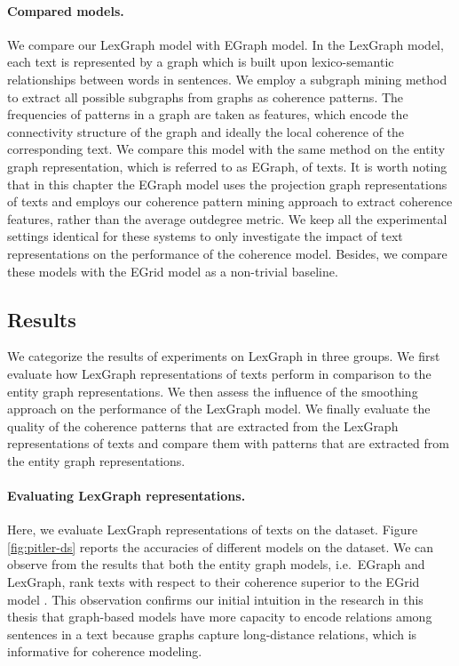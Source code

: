 \paragraph{Compared models.}
We compare our LexGraph model with EGraph model.
In the \mbox{LexGraph} model, each text is represented by a graph which is built upon lexico-semantic relationships between words in sentences.  
We employ a subgraph mining method to extract all possible subgraphs from graphs as coherence patterns. 
The frequencies of patterns in a graph are taken as features, which encode the connectivity structure of the graph and ideally the local coherence of the corresponding text. 
We compare this model with the same method on the entity graph representation, which is referred to as EGraph, of texts. 
It is worth noting that in this chapter the EGraph model uses the projection graph representations of texts and employs our coherence pattern mining approach to extract coherence features, rather than the average outdegree metric. 
We keep all the experimental settings identical for these systems to only investigate the impact of text representations on the performance of the coherence model. 
Besides, we compare these models with the EGrid model \cite{barzilay08} as a non-trivial baseline. 


\subsection{Results}
We categorize the results of experiments on LexGraph in three groups. 
We first evaluate how LexGraph representations of texts perform in comparison to the entity graph representations.  
We then assess the influence of the smoothing approach on the performance of the LexGraph model. 
We finally evaluate the quality of the coherence patterns that are extracted from the LexGraph representations of texts and compare them with patterns that are extracted from the entity graph representations.  

\paragraph{Evaluating LexGraph representations.} 
Here, we evaluate LexGraph representations of texts on the \pitlerds dataset. 
Figure \ref{fig:pitler-ds} reports the accuracies of different models on the \pitlerds dataset. 
We can observe from the results that both the entity graph models, i.e.\ EGraph and LexGraph, rank texts with respect to their coherence superior to the EGrid model \cite{barzilay08}.  
This observation confirms our initial intuition in the research in this thesis that graph-based models have more capacity to encode relations among sentences in a text because graphs capture long-distance relations, which is informative for coherence modeling.  

